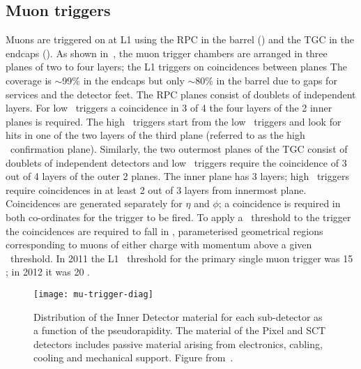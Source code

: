 \subsection{Muon triggers}
\label{sec:reco-mu-triggers}

Muons are triggered on at L1 using the RPC in the barrel () and
the TGC in the endcaps (). As shown in~, the
muon trigger chambers are arranged in three planes of two to four layers; the L1
triggers on coincidences between planes
The coverage is $\sim$99\% in the endcaps but only $\sim$80\% in the barrel due to
gaps for services and the detector feet.
The RPC planes consist of
doublets of independent layers. For low \pt\ triggers a coincidence in 3 of 4
the four layers of the 2 inner planes is required. The high \pt\ triggers start
from the low \pt\ triggers and look for hits in one of the two layers of the
third plane (referred to as the high \pt\ confirmation plane). Similarly, the two outermost
planes of the TGC consist of doublets of independent detectors and low \pt\
triggers require the coincidence of 3 out of 4 layers of the outer 2 planes. The
inner plane has 3 layers; high \pt\ triggers require coincidences in at least 2
out of 3 layers from innermost plane. Coincidences are generated separately for
$\eta$ and $\phi$; a coincidence is required in both co-ordinates for the
trigger to be fired. To apply a \pt\ threshold to the trigger the coincidences
are required to fall in \intro{roads}, parameterised geometrical regions
corresponding to muons of either charge with momentum above a given \pt\
threshold. In 2011 the L1 \pt\ threshold for the primary single muon trigger was
15 \GeV; in 2012 it was 20 \GeV.

\begin{figure}[h]
\centering
            \texttt{[image: mu-trigger-diag]}
\caption{
Distribution of the Inner Detector material for each sub-detector as a
function of the pseudorapidity. The material of the Pixel and SCT detectors
includes passive material arising from electronics, cabling, cooling and
mechanical support. Figure from~\cite{TriggerPerf2010}.}
\label{fig:mu-trigger-diag}
\end{figure}

